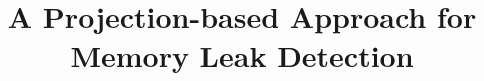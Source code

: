 \documentclass[conference]{IEEEtran}
\begin{document}
\renewcommand{\figurename}{Figure} 
\title{A Projection-based Approach for Memory Leak Detection}

\end{document}
